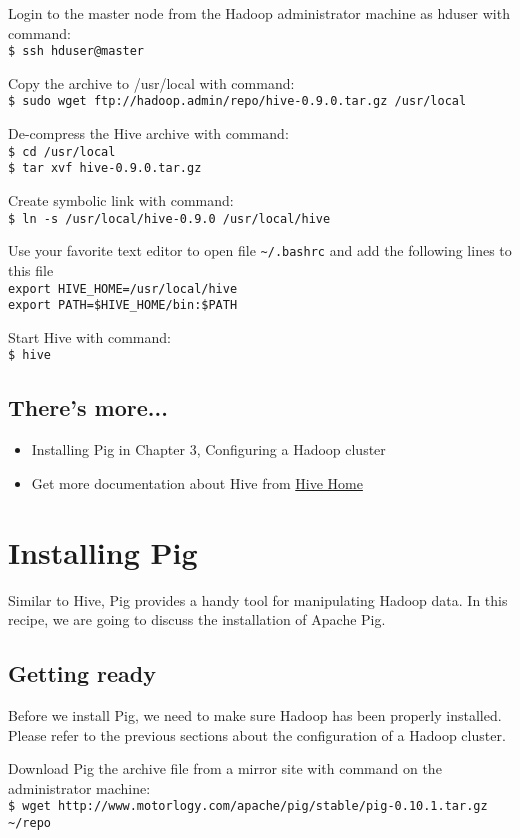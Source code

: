 Login to the master node from the Hadoop administrator machine as hduser with command: \\
\verb|$ ssh hduser@master|

Copy the archive to /usr/local with command: \\
\verb|$ sudo wget ftp://hadoop.admin/repo/hive-0.9.0.tar.gz /usr/local|

De-compress the Hive archive with command:\\
\verb|$ cd /usr/local| \\
\verb|$ tar xvf hive-0.9.0.tar.gz|

Create symbolic link with command: \\
\verb|$ ln -s /usr/local/hive-0.9.0 /usr/local/hive|

Use your favorite text editor to open file \verb|~/.bashrc| and add the following lines to this file \\
\verb|export HIVE_HOME=/usr/local/hive| \\
\verb|export PATH=$HIVE_HOME/bin:$PATH|

Start Hive with command: \\
\verb|$ hive|
\subsection*{There's more...}
\begin{itemize}
  \item Installing Pig in Chapter 3, Configuring a Hadoop cluster
  \item Get more documentation about Hive from \href{https://cwiki.apache.org/confluence/display/Hive/Home}{Hive Home}
\end{itemize}

\section{Installing Pig}
Similar to Hive, Pig provides a handy tool for manipulating Hadoop data. In this recipe, we are going to discuss the installation of Apache Pig.
\subsection*{Getting ready}
Before we install Pig, we need to make sure Hadoop has been properly installed. Please refer to the previous sections about the configuration of a Hadoop cluster.

Download Pig the archive file from a mirror site with command on the administrator machine: \\
\verb|$ wget http://www.motorlogy.com/apache/pig/stable/pig-0.10.1.tar.gz ~/repo|

